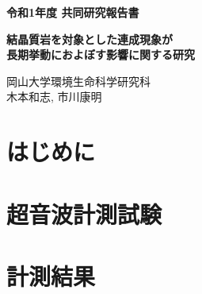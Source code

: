 ﻿\documentclass[11pt,a4j]{jarticle}
\newlength{\minitwocolumn}
\begin{document}
\newcommand{\fat}[1]{\mbox{\boldmath $#1$}}
\newcommand{\D}{\partial}
\newcommand{\w}{\omega}
\newcommand{\ga}{\alpha}
\newcommand{\gb}{\beta}
\newcommand{\gx}{\xi}
\newcommand{\gz}{\zeta}
\newcommand{\vhat}[1]{\hat{\fat{#1}}}
\newcommand{\spc}{\vspace{0.7\baselineskip}}
\newcommand{\halfspc}{\vspace{0.3\baselineskip}}

\pagestyle{empty}
\newcommand{\twofig}[2]
 {
   \begin{figure}[h]
     \begin{minipage}[t]{\minitwocolumn}
         \begin{center}   #1
         \end{center}
     \end{minipage}
         \hspace{\columnsep}
     \begin{minipage}[t]{\minitwocolumn}
         \begin{center} #2
         \end{center}
     \end{minipage}
   \end{figure}
 }
\begin{center}
{\Large \bf 令和1年度 共同研究報告書}
\end{center}
\vspace{2mm}
\begin{center}
{\LARGE \bf 結晶質岩を対象とした連成現象が\\
長期挙動におよぼす影響に関する研究} 
\end{center}
\begin{center}
岡山大学環境生命科学研究科\\
木本和志, 市川康明
\end{center}
\vspace{10mm}
\section{はじめに}
%
\section{超音波計測試験}

\section{計測結果}

\end{document}
